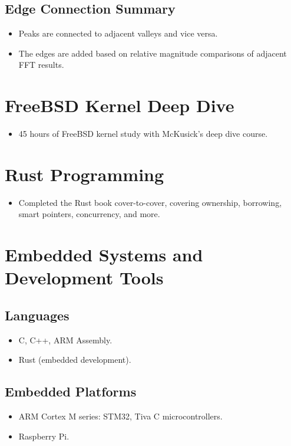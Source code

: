 \documentclass{article}
\begin{document}
\subsection*{Edge Connection Summary}
\begin{itemize}
    \item Peaks are connected to adjacent valleys and vice versa.
    \item The edges are added based on relative magnitude comparisons of adjacent FFT results.
\end{itemize}

\section*{FreeBSD Kernel Deep Dive}
\begin{itemize}
    \item 45 hours of FreeBSD kernel study with McKusick’s deep dive course.
\end{itemize}

\section*{Rust Programming}
\begin{itemize}
    \item Completed the Rust book cover-to-cover, covering ownership, borrowing, smart pointers, concurrency, and more.
\end{itemize}

\section*{Embedded Systems and Development Tools}
\subsection*{Languages}
\begin{itemize}
    \item C, C++, ARM Assembly.
    \item Rust (embedded development).
\end{itemize}

\subsection*{Embedded Platforms}
\begin{itemize}
    \item ARM Cortex M series: STM32, Tiva C microcontrollers.
    \item Raspberry Pi.
\end{itemize}
\end{document}
